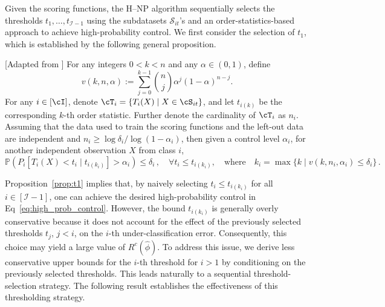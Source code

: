 Given the scoring functions, the H--NP algorithm sequentially selects the thresholds \(t_1, \ldots, t_{\mathcal{I}-1}\) using the subdatasets \(\mathcal{S}_{it}\)'s and an order-statistics-based approach to achieve high-probability control. We first consider the selection of \(t_1\), which is established by the following general proposition.
\begin{proposition}\label{prop:t1}[Adapted from \cite{tong2018neyman,wang2024hierarchical}]
For any integers \(0 < k < n\) and any \(\alpha \in (0,1)\), define
\begin{equation*}
    v(k,n,\alpha) := \sum_{j=0}^{k-1} \binom{n}{j}\alpha^j(1-\alpha)^{n-j}.
\end{equation*}
For any $i\in[\cI]$, %
denote $\cT_i = \{ T_i(X) \mid X\in \cS_{it}\}$, and let $t_{i(k)} $ be the corresponding $k$-th order statistic. Further denote the cardinality of $\cT_i$ as $n_i$. Assuming that the data used to train the scoring functions and the left-out data are independent and $n_i \geq \log \delta_i/ \log (1 - \alpha_i)$, then given a control level $\alpha_i$, for another independent observation $X$ from class $i$,
\begin{equation*}
\mathbb{P}\left(P_i\left[T_i(X) < t_i \mid t_{i(k_i)} \right] > \alpha_i\right) \leq  \delta_i \,, \quad \forall  t_i \leq t_{i(k_i)}, \quad \text{where} \quad k_i = \max \{k \mid v(k,n_i,\alpha_i) \leq \delta_i\} \,.
\end{equation*}
\end{proposition}

Proposition~\ref{prop:t1} implies that, by naively selecting \(t_i \le t_{i(k_i)}\) for all \(i \in [\mathcal{I}-1]\), one can achieve the desired high-probability control in Eq~\eqref{eq:high_prob_control}. However, the bound \(t_{i(k_i)}\) is generally overly conservative because it does not account for the effect of the previously selected thresholds \(t_j\), \(j<i\), on the \(i\)-th under-classification error. Consequently, this choice may yield a large value of \(R^c(\hat{\phi})\). To address this issue, we derive less conservative upper bounds for the \(i\)-th threshold for \(i>1\) by conditioning on the previously selected thresholds. This leads naturally to a sequential threshold-selection strategy.  The following result establishes the effectiveness of this thresholding strategy.


